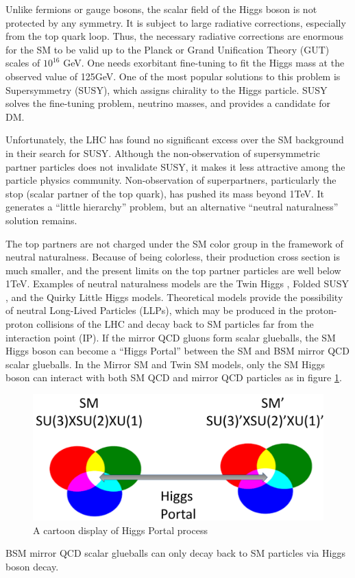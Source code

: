 Unlike fermions or gauge bosons, the scalar field of the Higgs boson is not protected by any symmetry. It is subject to large radiative corrections, especially from the top quark loop.
Thus, the necessary radiative corrections are enormous for the SM to be valid up to the Planck or Grand Unification Theory (GUT) scales of $10^{16}$ GeV.
One needs exorbitant fine-tuning to fit the Higgs mass at the observed value of 125GeV.
One of the most popular solutions to this problem is Supersymmetry (SUSY), which assigns chirality to the Higgs particle.
SUSY solves the fine-tuning problem, neutrino masses, and provides a candidate for DM.

Unfortunately, the LHC has found no significant excess over the SM background in their search for SUSY\cite{SUSY}.
Although the non-observation of supersymmetric partner particles does not invalidate SUSY, it makes it less attractive among the particle physics community.
Non-observation of superpartners, particularly the stop (scalar partner of the top quark), has pushed its mass beyond 1TeV.
It generates a ``little hierarchy'' problem, but an alternative ``neutral naturalness'' solution remains.

The top partners are not charged under the SM color group in the framework of neutral naturalness.
Because of being colorless, their production cross section is much smaller, and the present limits on the top partner particles are well below 1TeV.
Examples of neutral naturalness models are the Twin Higgs \cite{Chacko:2005pe},
Folded SUSY \cite{Burdman:2006tz}, and the Quirky Little Higgs \cite{Cai:2008au} models.
Theoretical models provide the possibility of neutral Long-Lived Particles (LLPs), which may be produced in the proton-proton
collisions of the LHC and decay back to SM particles far from the interaction point (IP).\cite{Craig:2015pha}
If the mirror QCD gluons form scalar glueballs, the SM Higgs boson can become a ``Higgs Portal'' between the SM and BSM mirror QCD scalar glueballs.
In the Mirror SM and Twin SM models, only the SM Higgs boson can interact with both SM QCD and mirror QCD particles as in figure \ref{fig:2HiggsPortal}.
\begin{figure}[h!]
  \caption{A cartoon display of Higgs Portal process}
  \label{fig:2HiggsPortal}
  \centering
  \includegraphics[width=0.87\linewidth]{figs/Portalcartoon.png}
\end{figure}
BSM mirror QCD scalar glueballs can only decay back to SM particles via Higgs boson decay.

